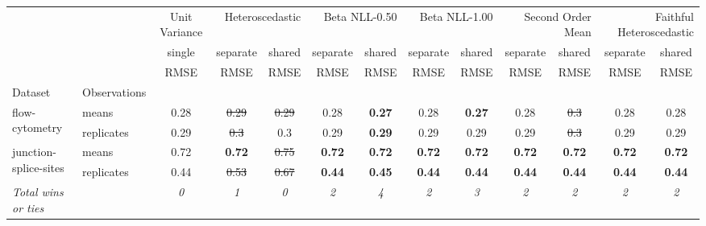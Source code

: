\begin{tabular}{ll|c|cc|cc|cc|cc|cc}
\toprule
{} & {} & {Unit Variance} & \multicolumn{2}{r}{Heteroscedastic} & \multicolumn{2}{r}{Beta NLL-0.50} & \multicolumn{2}{r}{Beta NLL-1.00} & \multicolumn{2}{r}{Second Order Mean} & \multicolumn{2}{r}{Faithful Heteroscedastic} \\
{} & {} & {single} & {separate} & {shared} & {separate} & {shared} & {separate} & {shared} & {separate} & {shared} & {separate} & {shared} \\
{} & {} & {RMSE} & {RMSE} & {RMSE} & {RMSE} & {RMSE} & {RMSE} & {RMSE} & {RMSE} & {RMSE} & {RMSE} & {RMSE} \\
{Dataset} & {Observations} & {} & {} & {} & {} & {} & {} & {} & {} & {} & {} & {} \\
\midrule
\multirow[t]{2}{*}{flow-cytometry} & means & 0.28 & \sout{0.29} & \sout{0.29} & 0.28 & \textbf{0.27} & 0.28 & \textbf{0.27} & 0.28 & \sout{0.3} & 0.28 & 0.28 \\
 & replicates & 0.29 & \sout{0.3} & 0.3 & 0.29 & \textbf{0.29} & 0.29 & 0.29 & 0.29 & \sout{0.3} & 0.29 & 0.29 \\
\multirow[t]{2}{*}{junction-splice-sites} & means & 0.72 & \textbf{0.72} & \sout{0.75} & \textbf{0.72} & \textbf{0.72} & \textbf{0.72} & \textbf{0.72} & \textbf{0.72} & \textbf{0.72} & \textbf{0.72} & \textbf{0.72} \\
 & replicates & 0.44 & \sout{0.53} & \sout{0.67} & \textbf{0.44} & \textbf{0.45} & \textbf{0.44} & \textbf{0.44} & \textbf{0.44} & \textbf{0.44} & \textbf{0.44} & \textbf{0.44} \\
\textit{{Total wins or ties}} &  & \textit{0} & \textit{1} & \textit{0} & \textit{2} & \textit{4} & \textit{2} & \textit{3} & \textit{2} & \textit{2} & \textit{2} & \textit{2} \\
\bottomrule
\end{tabular}

